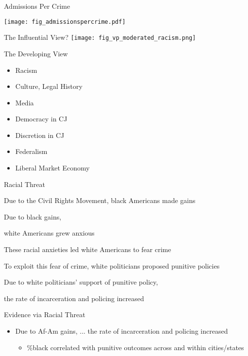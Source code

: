 \documentclass{beamer}
\newcommand{\claimone}{Due to the Civil Rights Movement, black Americans made gains}
\newcommand{\claimthree}{These racial anxieties led white Americans to fear crime}
\newcommand{\claimfour}{To exploit this fear of crime, white politicians proposed punitive policies}
\begin{document}
\begin{frame}{Admissions Per Crime}
\begin{center}
    \texttt{[image: fig\_admissionspercrime.pdf]}
\end{center}
\end{frame}

\begin{frame}{The Influential View?}
\texttt{[image: fig\_vp\_moderated\_racism.png]}
\end{frame}

\begin{frame}{The Developing View}
\begin{itemize}
    \item Racism \parencite{FormanJr2017}
    \item Culture, Legal History \parencite{Whitman2005,Garland2010}
    \item Media \parencite{Enns2016}
    \item Democracy in CJ \parencite{Savelsberg1994,Lacey2008,Garland2010,Lacey2015}
    \item Discretion in CJ \parencite{Pfaff2017}
    \item Federalism \parencite{Miller2008,Miller2016}
    \item Liberal Market Economy \parencite{Lacey2015,Garland2018}
\end{itemize}
\end{frame}

\begin{frame}{Racial Threat}
\begin{itemize}
    \item[1.] \claimone
    \item[2.] \alert{Due to black gains,} \textcolor{black!80}{white Americans grew anxious
    \item[3.] \claimthree
    \item[4.] \claimfour
    \item[5.] Due to white politicians' support of punitive policy,} \alert{the rate of incarceration and policing increased}
\end{itemize}
\end{frame}

\begin{frame}{Evidence via Racial Threat}
\begin{itemize}
\item[2-5.] Due to Af-Am gains, ... the rate of incarceration and policing increased
\begin{itemize}
    \item \%black correlated with punitive outcomes across and within cities/states
\end{itemize}
\end{itemize}
\end{frame}
\end{document}
